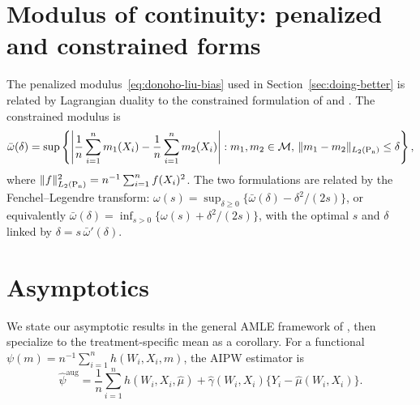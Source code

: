 \documentclass{article}
\DeclarePairedDelimiter\norm{\lVert}{\rVert}
\theoremstyle{definition}
\DeclareMathOperator{\Pn}{P_n}
\newcommand{\hgamma}{\ensuremath{\hat\gamma}}
\newcommand{\model}{\mathcal{M}}
\newcommand{\aug}{\text{aug}}
\newcommand{\<}{\langle}
\renewcommand{\>}{\rangle}
\begin{document}
\ifarxiv\begin{refsection}\fi

\section{Modulus of continuity: penalized and constrained forms}
\label{app:modulus-equivalence}

The penalized modulus~\eqref{eq:donoho-liu-bias} used in Section~\ref{sec:doing-better} is related by Lagrangian duality to the constrained formulation of \citet{donoho1994statistical} and \citet{armstrong2018optimal}. The constrained modulus is
\begin{equation}
\label{eq:modulus-constrained}
\bar\omega(\delta) = \sup\left\{\left|\frac{1}{n}\sum_{i=1}^n m_1(X_i) - \frac{1}{n}\sum_{i=1}^n m_2(X_i)\right| : m_1, m_2 \in \model,\, \norm{m_1 - m_2}_{L_2(\Pn)} \le \delta\right\},
\end{equation}
where $\norm{f}_{L_2(\Pn)}^2 = n^{-1}\sum_{i=1}^n f(X_i)^2$. The two formulations are related by the Fenchel--Legendre transform: $\omega(s) = \sup_{\delta \ge 0}\{\bar\omega(\delta) - \delta^2/(2s)\}$, or equivalently $\bar\omega(\delta) = \inf_{s > 0}\{\omega(s) + \delta^2/(2s)\}$, with the optimal $s$ and $\delta$ linked by $\delta = s\,\bar\omega'(\delta)$.

\section{Asymptotics}
\label{sec:appendix-asymptotic-normality}

We state our asymptotic results in the general AMLE framework of \citet{hirshberg2021augmented}, then specialize to the treatment-specific mean as a corollary. For a functional $\psi(m) = n^{-1}\sum_{i=1}^n h(W_i, X_i, m)$, the AIPW estimator is
\[
\hat\psi^{\aug} = \frac{1}{n}\sum_{i=1}^n h(W_i, X_i,\hat \mu) + \hgamma(W_i, X_i)\{Y_i - \hat \mu(W_i, X_i)\}.
\]


\end{refsection}
\end{document}
